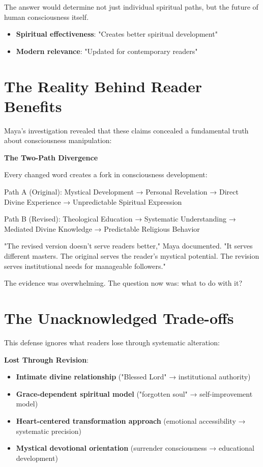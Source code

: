\documentclass[11pt,twoside]{book}
\begin{document}
The answer would determine not just individual spiritual paths, but the future of human consciousness itself.
\begin{itemize}
\item \textbf{\textbf{Spiritual effectiveness}}: "Creates better spiritual development"
\item \textbf{\textbf{Modern relevance}}: "Updated for contemporary readers"
\end{itemize}
\section*{The Reality Behind Reader Benefits}
\label{sec:orgc99d95e}

Maya's investigation revealed that these claims concealed a fundamental truth about consciousness manipulation:

\textbf{\textbf{The Two-Path Divergence}}

Every changed word creates a fork in consciousness development:

Path A (Original): 
Mystical Development → Personal Revelation → Direct Divine Experience → Unpredictable Spiritual Expression

Path B (Revised):
Theological Education → Systematic Understanding → Mediated Divine Knowledge → Predictable Religious Behavior

"The revised version doesn't serve readers better," Maya documented. "It serves different masters. The original serves the reader's mystical potential. The revision serves institutional needs for manageable followers."

The evidence was overwhelming. The question now was: what to do with it?
\section*{The Unacknowledged Trade-offs}
\label{sec:org5ba9737}
This defense ignores what readers lose through systematic alteration:

\textbf{\textbf{Lost Through Revision}}:
\begin{itemize}
\item \textbf{\textbf{Intimate divine relationship}} ("Blessed Lord" → institutional authority)
\item \textbf{\textbf{Grace-dependent spiritual model}} ("forgotten soul" → self-improvement model)
\item \textbf{\textbf{Heart-centered transformation approach}} (emotional accessibility → systematic precision)
\item \textbf{\textbf{Mystical devotional orientation}} (surrender consciousness → educational development)
\end{itemize}
\end{document}
